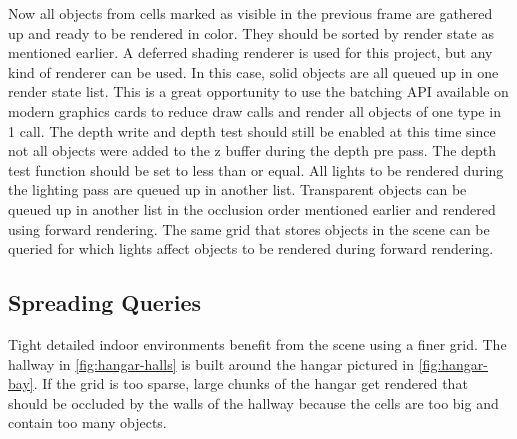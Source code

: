 \documentclass[12pt]{ucthesis}
\begin{document}
Now all objects from cells marked as visible in the previous frame are gathered up and ready to be rendered in color.
They should be sorted by render state as mentioned earlier.
A deferred shading renderer is used for this project, but any kind of renderer can be used.
In this case, solid objects are all queued up in one render state list.
This is a great opportunity to use the batching API available on modern graphics cards to reduce draw calls and render all objects of one type in 1 call.
The depth write and depth test should still be enabled at this time since not all objects were added to the z buffer during the depth pre pass.
The depth test function should be set to less than or equal.  All lights to be rendered during the lighting pass are queued up in another list.
Transparent objects can be queued up in another list in the occlusion order mentioned earlier and rendered using forward rendering.
The same grid that stores objects in the scene can be queried for which lights affect objects to be rendered during forward rendering.

\subsection {Spreading Queries}
\label{spreading-queries}

Tight detailed indoor environments benefit from the scene using a finer grid.
The hallway in \ref{fig:hangar-halls} is built around the hangar pictured in \ref{fig:hangar-bay}.
If the grid is too sparse, large chunks of the hangar get rendered that should be occluded by the walls of the hallway because the cells are too big and contain too many objects.
\end{document}
